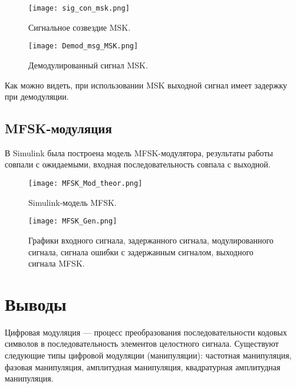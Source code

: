 \begin{figure}[H]
	\begin{center}
		\texttt{[image: sig\_con\_msk.png]}
		\caption{Сигнальное созвездие MSK.} %
		\label{sig_con_msk} %
	\end{center}
\end{figure}

\begin{figure}[H]
	\begin{center}
		\texttt{[image: Demod\_msg\_MSK.png]}
		\caption{Демодулированный сигнал MSK.} %
		\label{Demod_msg_MSK} %
	\end{center}
\end{figure}
Как можно видеть, при использовании MSK выходной сигнал имеет задержку при демодуляции.

\subsection{MFSK-модуляция}
В Simulink была построена модель MFSK-модулятора, результаты работы совпали с ожидаемыми, входная последовательность совпала с выходной.
\begin{figure}[H]
	\begin{center}
		\texttt{[image: MFSK\_Mod\_theor.png]}
		\caption{Simulink-модель MFSK.} %
		\label{MFSK_Mod_theor} %
	\end{center}
\end{figure}

\begin{figure}[H]
	\begin{center}
		\texttt{[image: MFSK\_Gen.png]}
		\caption{Графики входного сигнала, задержанного сигнала, модулированного сигнала, сигнала ошибки с задержанным сигналом, выходного сигнала MFSK.} %
		\label{MFSK_Gen} %
	\end{center}
\end{figure}
  
 
\section{Выводы}
Цифровая модуляция — процесс преобразования последовательности кодовых символов в последовательность элементов целостного сигнала. Существуют следующие типы цифровой модуляции (манипуляции): частотная манипуляция, фазовая манипуляция, амплитудная манипуляция, квадратурная амплитудная манипуляция. 


